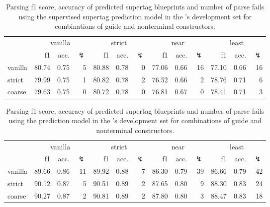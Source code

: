 \documentclass[../../document.tex]{subfiles}
\begin{document}
    \begin{table}
        \caption{\label{tbl:gridsearch:1:2}
            Parsing f1 score, accuracy of predicted supertag blueprints and number of parse fails using the supervised supertag prediction model in the \negra{}'s development set for combinations of guide and nonterminal constructors.
        }
        \centering
        \vspace{.2cm}
        \begin{tabular}{l|rrr|rrr|rrr|rrr}
            \toprule
                        & \multicolumn{3}{c|}{vanilla} & \multicolumn{3}{c|}{strict} & \multicolumn{3}{c|}{near} & \multicolumn{3}{c}{least}  \\
                        & f1 & acc. & $\lightning$ & f1 & acc. & $\lightning$ & f1 & acc. & $\lightning$ & f1 & acc. & $\lightning$  \\ \hline
            vanilla     & 80.74 & 0.75 & 5 & 80.88 & 0.78 & 0 & 77.06 & 0.66 & 16 & 77.10 & 0.66 & 16 \\
            strict      & 79.99 & 0.75 & 1 & 80.82 & 0.78 & 2 & 76.52 & 0.66 &  2 & 78.76 & 0.71 &  6 \\
            coarse      & 79.63 & 0.75 & 0 & 80.72 & 0.78 & 0 & 76.81 & 0.67 &  0 & 78.41 & 0.71 &  3 \\
            \bottomrule
        \end{tabular}
    \end{table}
    
    
    \begin{table}
        \caption{\label{tbl:gridsearch:1:3}
            Parsing f1 score, accuracy of predicted supertag blueprints and number of parse fails using the  prediction model in the \negra{}'s development set for combinations of guide and nonterminal constructors.
        }
        \centering
        \vspace{.2cm}
        \begin{tabular}{l|rrr|rrr|rrr|rrr}
            \toprule
                        & \multicolumn{3}{c|}{vanilla} & \multicolumn{3}{c|}{strict} & \multicolumn{3}{c|}{near} & \multicolumn{3}{c}{least}  \\
                        & f1 & acc. & $\lightning$ & f1 & acc. & $\lightning$ & f1 & acc. & $\lightning$ & f1 & acc. & $\lightning$  \\ \hline
            vanilla     & 89.66 & 0.86 & 11 & 89.92 & 0.88 & 7 & 86.30 & 0.79 & 39 & 86.66 & 0.79 & 42 \\
            strict      & 90.12 & 0.87 &  5 & 90.51 & 0.89 & 2 & 87.65 & 0.80 &  9 & 88.30 & 0.83 & 24 \\
            coarse      & 90.27 & 0.87 &  2 & 90.81 & 0.89 & 2 & 87.80 & 0.80 &  3 & 88.47 & 0.83 & 18 \\
            \bottomrule
        \end{tabular}
    \end{table}
    
\end{document}
